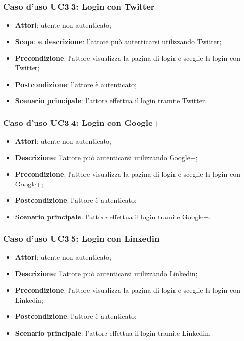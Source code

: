 \subsubsection{Caso d'uso UC3.3: Login con Twitter}
\begin{itemize}
	\item \textbf{Attori}: utente non autenticato;
	\item \textbf{Scopo e descrizione}: l'attore può autenticarsi utilizzando Twitter;
	\item \textbf{Precondizione}: l'attore visualizza la pagina di login e sceglie la login con Twitter;
	\item \textbf{Postcondizione}: l'attore è autenticato;
	\item \textbf{Scenario principale}: l'attore effettua il login tramite Twitter.
\end{itemize}
\subsubsection{Caso d'uso UC3.4: Login con Google+}
\begin{itemize}
	\item \textbf{Attori}: utente non autenticato;
	\item \textbf{Descrizione}: l'attore può autenticarsi utilizzando Google+;
	\item \textbf{Precondizione}: l'attore visualizza la pagina di login e sceglie la login con Google+;
	\item \textbf{Postcondizione}: l'attore è autenticato;
	\item \textbf{Scenario principale}: l'attore effettua il login tramite Google+.
\end{itemize}
\subsubsection{Caso d'uso UC3.5: Login con Linkedin}
\begin{itemize}
	\item \textbf{Attori}: utente non autenticato;
	\item \textbf{Descrizione}: l'attore può autenticarsi utilizzando Linkedin;
	\item \textbf{Precondizione}: l'attore visualizza la pagina di login e sceglie la login con Linkedin;
	\item \textbf{Postcondizione}: l'attore è autenticato;
	\item \textbf{Scenario principale}: l'attore effettua il login tramite Linkedin.
\end{itemize}